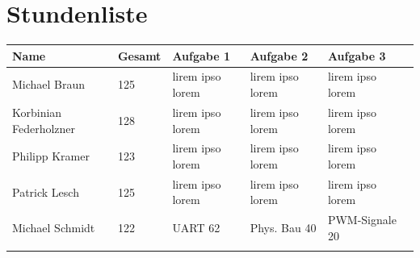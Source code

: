 \documentclass[12pt,a4paper,bibliography=totoc,listof=totoc]{scrartcl}
\begin{document}
\section {Stundenliste}

\begin{tabularx}{\textwidth}{p{}|l|l|l|l|l|}
\hline
 Name					& Gesamt &Aufgabe 1	&Aufgabe 2	&Aufgabe 3 \\
 \hline
 Michael Braun			&125			&lirem ipso lorem			&lirem ipso lorem			&lirem ipso lorem			\\
 \hline
 Korbinian Federholzner	&128			&lirem ipso lorem			&lirem ipso lorem			&lirem ipso lorem			\\
 \hline
 Philipp Kramer			&123			&lirem ipso lorem			&lirem ipso lorem			&lirem ipso lorem			\\
 \hline
 Patrick Lesch			&125			&lirem ipso lorem			&lirem ipso lorem			&lirem ipso lorem			\\
 \hline
 Michael Schmidt		&122			&UART 62			& Phys. Bau 40			&PWM-Signale 20			\\
  \hline
\label{tbl:stundenliste}
\end{tabularx}
\end{document}
